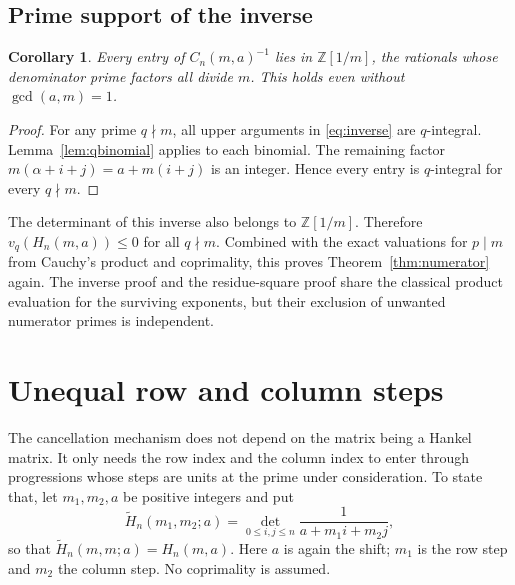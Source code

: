 \documentclass[11pt,a4paper]{article}
\numberwithin{equation}{section}
\newtheorem{corollary}[theorem]{Corollary}
\theoremstyle{definition}
\theoremstyle{remark}
\newcommand{\Z}{\mathbb{Z}}
\begin{document}
\subsection{Prime support of the inverse}
\begin{corollary}\label{cor:localizedinverse}
Every entry of $C_n(m,a)^{-1}$ lies in $\Z[1/m]$, the rationals whose denominator prime factors all divide $m$. This holds even without $\gcd(a,m)=1$.
\end{corollary}
\begin{proof}
For any prime $q\nmid m$, all upper arguments in \eqref{eq:inverse} are $q$-integral. Lemma~\ref{lem:qbinomial} applies to each binomial. The remaining factor $m(\alpha+i+j)=a+m(i+j)$ is an integer. Hence every entry is $q$-integral for every $q\nmid m$.
\end{proof}

The determinant of this inverse also belongs to $\Z[1/m]$. Therefore
$v_q(H_n(m,a))\leq0$ for all $q\nmid m$. Combined with the exact valuations for $p\mid m$ from Cauchy's product and coprimality, this proves Theorem~\ref{thm:numerator} again. The inverse proof and the residue-square proof share the classical product evaluation for the surviving exponents, but their exclusion of unwanted numerator primes is independent.

\section{Unequal row and column steps}\label{sec:twosteps}

The cancellation mechanism does not depend on the matrix being a Hankel matrix. It only needs the row index and the column index to enter through progressions whose steps are units at the prime under consideration. To state that, let $m_1,m_2,a$ be positive integers and put
\begin{equation}\label{eq:twostepdef}
 \widetilde H_n(m_1,m_2;a)
 =\det_{0\leq i,j\leq n}\frac1{a+m_1i+m_2j},
\end{equation}
so that $\widetilde H_n(m,m;a)=H_n(m,a)$. Here $a$ is again the shift; $m_1$ is the row step and $m_2$ the column step. No coprimality is assumed.
\end{document}
